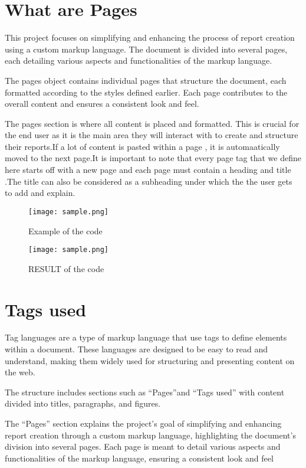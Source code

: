 \documentclass[oneside]{book}
\begin{document}
\section{What are Pages}
This project focuses on simplifying and enhancing the process of report creation using a custom markup language. The document is divided into several 
            pages, each detailing various aspects and functionalities of the markup language. \par
The pages object contains individual pages that structure the document, each formatted according to the styles defined earlier. Each page contributes 
            to the overall content and ensures a consistent look and feel.\par
The pages section is where all content is placed and formatted. This is crucial for the end user as it is the main area they will interact with to create 
            and structure their reports.If a lot of content is pasted within a page , it is automaatically moved to the next page.It is important to note that every page 
            tag that we define here starts off with a new page and each page must contain a heading and title .The title can also be considered as a subheading under which the
            the user gets to add and explain.\par
\begin{figure}[h]
\centering
\texttt{[image: sample.png]}
\caption{Example of the code}
\end{figure}\begin{figure}[h]
\centering
\texttt{[image: sample.png]}
\caption{RESULT of the code}
\end{figure}\section{Tags used}
Tag languages are a type of markup language that use tags to define elements within a document. These languages are designed to be easy to read and 
            understand, making them widely used for structuring and presenting content on the web.\par
The structure includes sections such as ``Pages''and ``Tags used'' with content divided into titles, paragraphs, and figures.\par
The ``Pages'' section explains the project's goal of simplifying and enhancing report creation through a custom markup language, highlighting the document's
            division into several pages. Each page is meant to detail various aspects and functionalities of the markup language, ensuring a consistent look and feel
\end{document}
